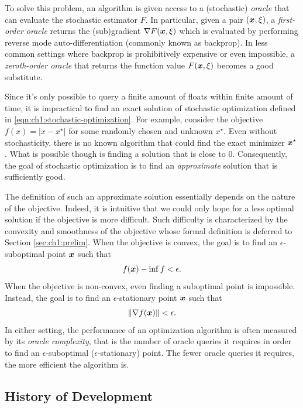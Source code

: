 To solve this problem, an algorithm is given access to a (stochastic) \emph{oracle} that can evaluate the stochastic estimator $F$. In particular, given a pair $({\boldsymbol{x}},\xi)$, a \emph{first-order oracle} returns the (sub)gradient $\nabla F({\boldsymbol{x}},\xi)$ which is evaluated by performing reverse mode auto-differentiation (commonly known as backprop). In less common settings where backprop is prohibitively expensive or even impossible, a \emph{zeroth-order oracle} that returns the function value $F({\boldsymbol{x}},\xi)$ becomes a good substitute. 

Since it's only possible to query a finite amount of floats within finite amount of time, it is impractical to find an exact solution of stochastic optimization defined in \eqref{eqn:ch1:stochastic-optimization}. For example, consider the objective $f(x)=|x-x^\star|$ for some randomly chosen and unknown $x^\star$. Even without stochasticity, there is no known algorithm that could find the exact minimizer ${\boldsymbol{x}}^\star$. What is possible though is finding a solution that is close to $0$. Consequently, the goal of stochastic optimization is to find an \emph{approximate} solution that is sufficiently good.

The definition of such an approximate solution essentially depends on the nature of the objective. Indeed, it is intuitive that we could only hope for a less optimal solution if the objective is more difficult. Such difficulty is characterized by the convexity and smoothness of the objective whose formal definition is deferred to Section \ref{sec:ch1:prelim}. When the objective is convex, the goal is to find an $\epsilon$-suboptimal point ${\boldsymbol{x}}$ such that 
\begin{equation}
    f({\boldsymbol{x}}) - \inf f < \epsilon.
    \label{eqn:ch1:eps-suboptimal}
\end{equation}
When the objective is non-convex, even finding a suboptimal point is impossible. Instead, the goal is to find an $\epsilon$-stationary point ${\boldsymbol{x}}$ such that 
\begin{equation}
    \| \nabla f({\boldsymbol{x}}) \| < \epsilon.
    \label{eqn:ch1:eps-stationary}
\end{equation}
In either setting, the performance of an optimization algorithm is often measured by its \emph{oracle complexity}, that is the number of oracle queries it requires in order to find an $\epsilon$-suboptimal ($\epsilon$-stationary) point. The fewer oracle queries it requires, the more efficient the algorithm is.


\subsection{History of Development}

